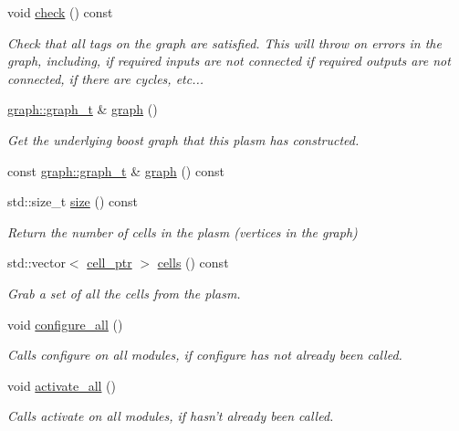 \begin{DoxyCompactItemize}
void \hyperlink{structecto_1_1plasm_a9554edd5758b8a83ed092a81e249f64a}{check} () const 
\begin{DoxyCompactList}\small\item\em Check that all tags on the graph are satisfied. This will throw on errors in the graph, including, if required inputs are not connected if required outputs are not connected, if there are cycles, etc... \end{DoxyCompactList}\item 
\hyperlink{structecto_1_1graph_1_1graph__t}{graph\-::graph\-\_\-t} \& \hyperlink{structecto_1_1plasm_a4f8de02440afdad0aa395fbaea03399e}{graph} ()
\begin{DoxyCompactList}\small\item\em Get the underlying boost graph that this plasm has constructed. \end{DoxyCompactList}\item 
const \hyperlink{structecto_1_1graph_1_1graph__t}{graph\-::graph\-\_\-t} \& \hyperlink{structecto_1_1plasm_ac6cde6d1d615e85f442ce299fdf0e7a0}{graph} () const 
\item 
std\-::size\-\_\-t \hyperlink{structecto_1_1plasm_aaeeabeb3f78c1a7291eb14e0f705574e}{size} () const 
\begin{DoxyCompactList}\small\item\em Return the number of cells in the plasm (vertices in the graph) \end{DoxyCompactList}\item 
std\-::vector$<$ \hyperlink{namespaceecto_aed1809e82b9229ea81ef9ee3438cf62c}{cell\-\_\-ptr} $>$ \hyperlink{structecto_1_1plasm_aa7724234d631563b10de07030c066e01}{cells} () const 
\begin{DoxyCompactList}\small\item\em Grab a set of all the cells from the plasm. \end{DoxyCompactList}\item 
void \hyperlink{structecto_1_1plasm_a55d56445bd1d09b9422390fb49e81bec}{configure\-\_\-all} ()
\begin{DoxyCompactList}\small\item\em Calls configure on all modules, if configure has not already been called. \end{DoxyCompactList}\item 
void \hyperlink{structecto_1_1plasm_a4419135c6c8dd8bb0cc7f4807a025df2}{activate\-\_\-all} ()
\begin{DoxyCompactList}\small\item\em Calls activate on all modules, if hasn't already been called. \end{DoxyCompactList}\item 

\end{DoxyCompactItemize}
